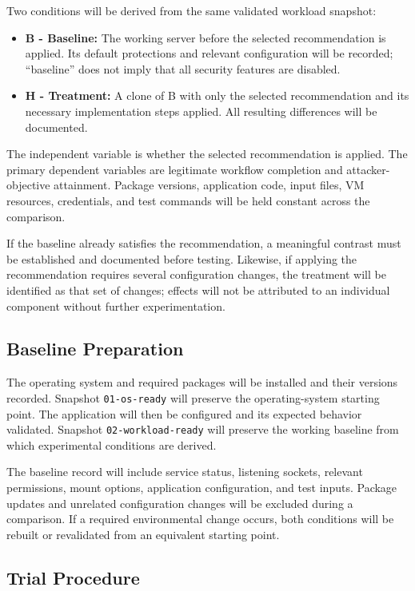\documentclass[12pt,letterpaper]{article}
\begin{document}
Two conditions will be derived from the same validated workload snapshot:

\begin{itemize}
\item \textbf{B - Baseline:} The working server before the selected recommendation is applied. Its default protections and relevant configuration will be recorded; ``baseline'' does not imply that all security features are disabled.
\item \textbf{H - Treatment:} A clone of B with only the selected recommendation and its necessary implementation steps applied. All resulting differences will be documented.
\end{itemize}

The independent variable is whether the selected recommendation is applied. The primary dependent variables are legitimate workflow completion and attacker-objective attainment. Package versions, application code, input files, VM resources, credentials, and test commands will be held constant across the comparison.

If the baseline already satisfies the recommendation, a meaningful contrast must be established and documented before testing. Likewise, if applying the recommendation requires several configuration changes, the treatment will be identified as that set of changes; effects will not be attributed to an individual component without further experimentation.
\subsection{Baseline Preparation}
\label{sec:org074e459}

The operating system and required packages will be installed and their versions recorded. Snapshot \texttt{01-os-ready} will preserve the operating-system starting point. The application will then be configured and its expected behavior validated. Snapshot \texttt{02-workload-ready} will preserve the working baseline from which experimental conditions are derived.

The baseline record will include service status, listening sockets, relevant permissions, mount options, application configuration, and test inputs. Package updates and unrelated configuration changes will be excluded during a comparison. If a required environmental change occurs, both conditions will be rebuilt or revalidated from an equivalent starting point.
\subsection{Trial Procedure}
\label{sec:org703661b}
\end{document}
